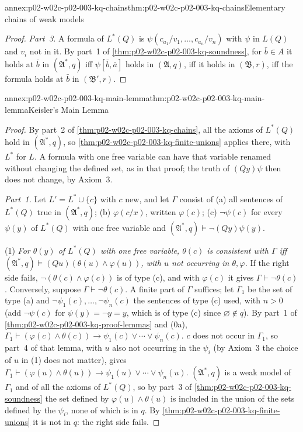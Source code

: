 \begin{annexitem}{annex:p02-w02c-p02-003-kq-chains}{thm:p02-w02c-p02-003-kq-chains}{Elementary chains of weak models}
\begin{proof}
\emph{Part~3.}  A formula of \(L^{*}(Q)\) is
\(\psi(c_{a_1}/v_1,\ldots,c_{a_n}/v_n)\) with \(\psi\) in \(L(Q)\) and
\(v_i\) not in it.  By part~1 of \cref{thm:p02-w02c-p02-003-kq-soundness},
for \(\bar b\in A\) it holds at \(\bar b\) in \((\mathfrak A^{*},q)\) iff
\(\psi[\bar b,\bar a]\) holds in \((\mathfrak A,q)\), iff it holds in
\((\mathfrak B,r)\), iff the formula holds at \(\bar b\) in
\((\mathfrak B',r)\).
\end{proof}
\end{annexitem}

\begin{annexitem}{annex:p02-w02c-p02-003-kq-main-lemma}{thm:p02-w02c-p02-003-kq-main-lemma}{Keisler's Main Lemma}
\begin{proof}
By part~2 of \cref{thm:p02-w02c-p02-003-kq-chains}, all the axioms of
\(L^{*}(Q)\) hold in \((\mathfrak A^{*},q)\), so
\cref{thm:p02-w02c-p02-003-kq-finite-unions} applies there, with
\(L^{*}\) for \(L\).  A formula with one free variable can have that
variable renamed without changing the defined set, as in that proof; the
truth of \((Qy)\psi\) then does not change, by Axiom~3.

\emph{Part~1.}  Let \(L'=L^{*}\cup\{c\}\) with \(c\) new, and let
\(\Gamma\) consist of (a) all sentences of \(L^{*}(Q)\) true in
\((\mathfrak A^{*},q)\); (b) \(\varphi(c/x)\), written \(\varphi(c)\); (c)
\(\neg\psi(c)\) for every \(\psi(y)\) of \(L^{*}(Q)\) with one free variable
and \((\mathfrak A^{*},q)\models\neg(Qy)\psi(y)\).

(1) \emph{For \(\theta(y)\) of \(L^{*}(Q)\) with one free variable,
\(\theta(c)\) is consistent with \(\Gamma\) iff
\((\mathfrak A^{*},q)\models(Qu)(\theta(u)\land\varphi(u))\), with \(u\) not
occurring in \(\theta,\varphi\).}  If the right side fails,
\(\neg(\theta(c)\land\varphi(c))\) is of type (c), and with \(\varphi(c)\) it
gives \(\Gamma\vdash\neg\theta(c)\).  Conversely, suppose
\(\Gamma\vdash\neg\theta(c)\).  A finite part of \(\Gamma\) suffices; let
\(\Gamma_1\) be the set of type (a) and \(\neg\psi_1(c),\ldots,\neg\psi_n(c)\)
the sentences of type (c) used, with \(n>0\) (add \(\neg\psi(c)\) for
\(\psi(y)=\neg y=y\), which is of type (c) since \(\varnothing\notin q\)).
By part~1 of \cref{thm:p02-w02c-p02-003-kq-proof-lemmas} and (0a),
\(\Gamma_1\vdash(\varphi(c)\land\theta(c))\to\psi_1(c)\lor\cdots\lor\psi_n(c)\).
\(c\) does not occur in \(\Gamma_1\), so part~4 of that lemma, with
\(u\) also not occurring in the \(\psi_i\) (by Axiom~3 the choice of \(u\)
in (1) does not matter), gives
\(\Gamma_1\vdash(\varphi(u)\land\theta(u))\to\psi_1(u)\lor\cdots\lor\psi_n(u)\).
\((\mathfrak A^{*},q)\) is a weak model of \(\Gamma_1\) and of all the
axioms of \(L^{*}(Q)\), so by part~3 of
\cref{thm:p02-w02c-p02-003-kq-soundness} the set defined by
\(\varphi(u)\land\theta(u)\) is included in the union of the sets defined by
the \(\psi_i\), none of which is in \(q\).  By
\cref{thm:p02-w02c-p02-003-kq-finite-unions} it is not in \(q\): the right
side fails.


\end{proof}
\end{annexitem}
